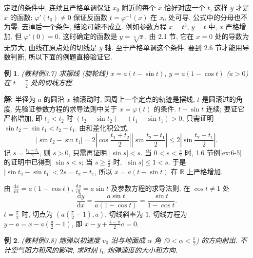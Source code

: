 \documentclass[UTF8,openany]{ctexbook}
\theoremstyle{chinesetextbook}
\newtheorem{example}{例}[section]
\newenvironment{cnsolution}{\par\indent\textbf{解:} \ignorespaces}{\par}
\newcommand{\dd}{\mathrm d}
\begin{document}
定理的条件中, 连续且严格单调保证 $x_0$ 附近的每个 $x$ 恰好对应一个 $t$, 这样 $y$ 才是 $x$ 的函数; $\varphi'(t_0)\ne0$ 保证反函数 $t=\varphi^{-1}(x)$ 在 $x_0$ 处可导, 公式中的分母也不为零. 去掉后一个条件, 结论可能不成立. 例如参数方程 $x=t^3$, $y=t$ 中, $x$ 严格增加, 但 $\varphi'(0)=0$. 这时确定的函数是 $y=\sqrt[3]x$, 由 2.1 节, 它在 $x=0$ 处的导数为无穷大, 曲线在原点处的切线是 $y$ 轴. 至于严格单调这个条件, 要到 2.6 节才能用导数判断, 所以下面的例题直接验证它.
\begin{example}\label{ex:c2-3-7}
\textnormal{(教材例3.7)} 求摆线 (旋轮线) $x=a(t-\sin t)$, $y=a(1-\cos t)$ ($a>0$) 在 $\displaystyle t=\frac\pi2$ 处的切线方程.
\end{example}
\begin{cnsolution}
半径为 $a$ 的圆沿 $x$ 轴滚动时, 圆周上一个定点的轨迹是摆线, $t$ 是圆滚过的角度. 先验证参数方程的求导法则中关于 $x=\varphi(t)$ 的条件. $t-\sin t$ 连续; 要证它严格增加, 即 $t_1<t_2$ 时 $(t_2-\sin t_2)-(t_1-\sin t_1)>0$, 只需证明 $\sin t_2-\sin t_1<t_2-t_1$. 由和差化积公式,
\[
|\sin t_2-\sin t_1|=2\left|\cos\frac{t_1+t_2}2\right|\left|\sin\frac{t_2-t_1}2\right|\le2\left|\sin\frac{t_2-t_1}2\right|.
\]
记 $\displaystyle s=\frac{t_2-t_1}2$, 则 $s>0$, 只需再证明 $|\sin s|<s$. 当 $\displaystyle0<s<\frac\pi2$ 时, 1.6 节例\ref{ex:6-5} 的证明中已得到 $\sin s<s$; 当 $\displaystyle s\ge\frac\pi2$ 时, $|\sin s|\le1<s$. 于是 $|\sin t_2-\sin t_1|<2s=t_2-t_1$, 所以 $x=a(t-\sin t)$ 在 $\mathbb R$ 上严格增加.

由 $\displaystyle\frac{\dd x}{\dd t}=a(1-\cos t)$, $\displaystyle\frac{\dd y}{\dd t}=a\sin t$ 及参数方程的求导法则, 在 $\cos t\ne1$ 处
\[
\frac{\dd y}{\dd x}=\frac{a\sin t}{a(1-\cos t)}=\frac{\sin t}{1-\cos t}.
\]
$\displaystyle t=\frac\pi2$ 时, 切点为 $\displaystyle\left(a\left(\frac\pi2-1\right),a\right)$, 切线斜率为 $1$, 切线方程为 $\displaystyle y-a=x-a\left(\frac\pi2-1\right)$, 即 $\displaystyle x-y+\frac{4-\pi}2a=0$.
\end{cnsolution}
\begin{example}\label{ex:c2-3-8}
\textnormal{(教材例3.8)} 炮弹以初速度 $v_0$ 沿与地面成 $\alpha$ 角 ($\displaystyle0<\alpha<\frac\pi2$) 的方向射出. 不计空气阻力和风的影响, 求时刻 $t_0$ 炮弹速度的大小和方向.
\end{example}
\end{document}
